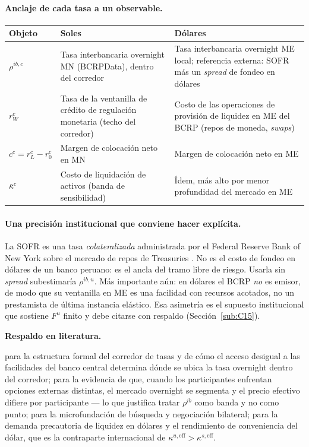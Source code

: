 \documentclass[11pt]{article}
\newcommand{\lit}{\par\noindent\textbf{Respaldo en literatura.}\par}
\theoremstyle{definition}
\begin{document}
\paragraph{Anclaje de cada tasa a un observable.}
\begin{center}
\begin{tabular}{@{}p{2.2cm}p{5.2cm}p{6.6cm}@{}}
\toprule
\textbf{Objeto} & \textbf{Soles} & \textbf{D\'olares} \\
\midrule
$\rho^{ib,c}$ & Tasa interbancaria overnight MN (BCRPData), dentro del corredor
& Tasa interbancaria overnight ME local; referencia externa: SOFR
\citep{nyfedsofr} m\'as un \emph{spread} de fondeo en d\'olares \\
$r^c_W$ & Tasa de la ventanilla de cr\'edito de regulaci\'on monetaria (techo del
corredor) & Costo de las operaciones de provisi\'on de liquidez en ME del BCRP
(repos de moneda, \emph{swaps}) \\
$c^c=r^c_L-r^c_0$ & Margen de colocaci\'on neto en MN & Margen de colocaci\'on neto
en ME \\
$\bar\kappa^c$ & Costo de liquidaci\'on de activos (banda de sensibilidad) &
\'Idem, m\'as alto por menor profundidad del mercado en ME \\
\bottomrule
\end{tabular}
\end{center}

\paragraph{Una precisi\'on institucional que conviene hacer expl\'icita.} La SOFR
es una tasa \emph{colateralizada} administrada por el Federal Reserve Bank of
New York sobre el mercado de repos de Treasuries \citep{nyfedsofr}. No es el
costo de fondeo en d\'olares de un banco peruano: es el ancla del tramo libre de
riesgo. Usarla sin \emph{spread} subestimar\'ia $\rho^{ib,u}$. M\'as importante
a\'un: en d\'olares el BCRP \emph{no} es emisor, de modo que su ventanilla en ME es
una facilidad con recursos acotados, no un prestamista de \'ultima instancia
el\'astico. Esa asimetr\'ia es el supuesto institucional que sostiene $F^u$ finito
y debe citarse con respaldo (Secci\'on~\ref{sub:C15}).

\lit
\citet{armenterlester2017} para la estructura formal del corredor de tasas y de
c\'omo el acceso desigual a las facilidades del banco central determina d\'onde se
ubica la tasa overnight dentro del corredor; \citet{bechklee2011} para la
evidencia de que, cuando los participantes enfrentan opciones externas
distintas, el mercado overnight se segmenta y el precio efectivo difiere por
participante --- lo que justifica tratar $\rho^{ib}$ como banda y no como punto;
\citet{afonso2015} para la microfundaci\'on de b\'usqueda y negociaci\'on bilateral;
\citet{bianchibigioengel2021} para la demanda precautoria de liquidez en d\'olares
y el rendimiento de conveniencia del d\'olar, que es la contraparte internacional
de $\kappa^{u,\mathrm{eff}}>\kappa^{s,\mathrm{eff}}$.
\end{document}
